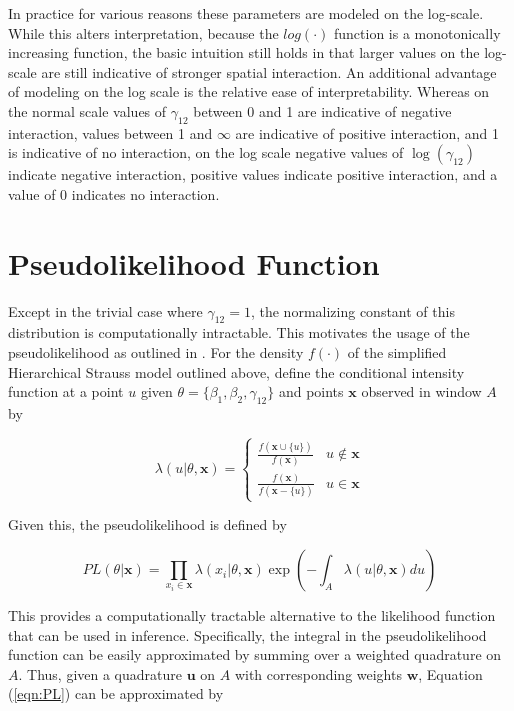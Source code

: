 \documentclass[
]{book}
\begin{document}
In practice for various reasons these parameters are modeled on
the log-scale. While this alters interpretation,
because the \(log(\cdot)\) function is a monotonically increasing
function, the basic intuition still holds in that larger values
on the log-scale are still indicative of stronger spatial
interaction. An additional advantage of modeling on the log scale
is the relative ease of interpretability. Whereas on the normal
scale values of \(\gamma_{12}\) between 0 and 1 are indicative of
negative interaction, values between 1 and \(\infty\) are
indicative of positive interaction, and 1 is indicative of no interaction,
on the log scale negative values of \(\log(\gamma_{12})\) indicate negative
interaction, positive values indicate positive interaction, and a value
of 0 indicates no interaction.

\hypertarget{pseudolikelihood-function}{%
\section{Pseudolikelihood Function}\label{pseudolikelihood-function}}

Except in the trivial case where \(\gamma_{12} = 1\), the normalizing constant of this distribution is computationally intractable. This motivates the usage of the pseudolikelihood as outlined in \citet{BT00}. For the density \(f(\cdot)\) of the simplified Hierarchical Strauss model outlined above, define the conditional intensity function at a point \(u\) given \(\theta = \{\beta_1, \beta_2, \gamma_{12}\}\) and points \({\mathbf{x}}\) observed in window \(A\) by

\begin{equation}
\label{eqn:CL}
\lambda(u|\theta, {\mathbf{x}}) = 
\begin{cases}
\frac{f({\mathbf{x}} \cup \{u\})}{f({\mathbf{x}})} & u \not\in {\mathbf{x}} \\
\frac{f({\mathbf{x}})}{f({\mathbf{x}} - \{u\})} & u \in {\mathbf{x}}
\end{cases}
\tag{2}
\end{equation}

Given this, the pseudolikelihood is defined by

\begin{equation}
\label{eqn:PL}
PL(\theta | {\mathbf{x}}) = 
\prod_{x_i \in {\mathbf{x}}} \lambda(x_i | \theta, {\mathbf{x}}) \exp(-\int_A \lambda(u | \theta, {\mathbf{x}}) du) \tag{3}
\end{equation}

This provides a computationally tractable alternative to the likelihood function that can be used in inference. Specifically, the integral in the pseudolikelihood function can be easily approximated by summing over a weighted quadrature on \(A\). Thus, given a quadrature \({\mathbf{u}}\) on \(A\) with corresponding weights \({\mathbf{w}}\), Equation (\ref{eqn:PL}) can be approximated by
\end{document}
